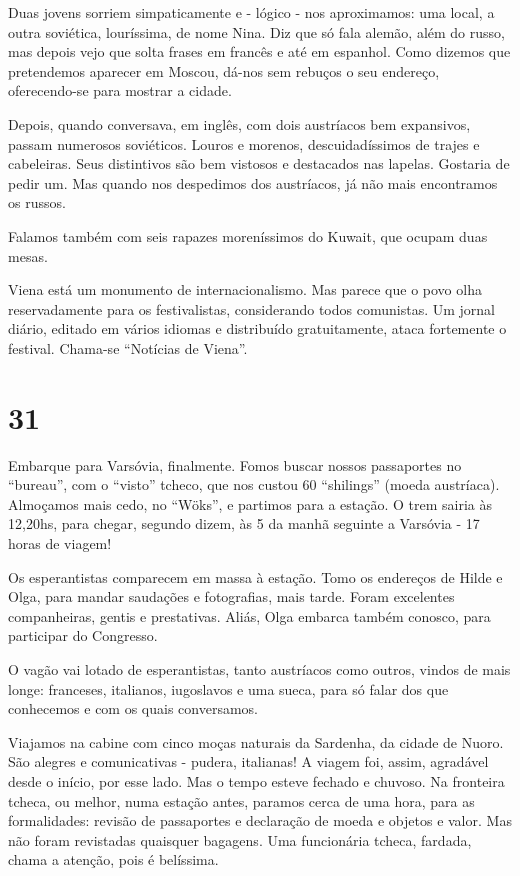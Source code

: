 Duas jovens sorriem simpaticamente e - lógico - nos aproximamos: uma local, a outra soviética, louríssima, de nome Nina. Diz que só fala alemão, além do russo, mas depois vejo que solta frases em francês e até em espanhol. Como dizemos que pretendemos aparecer em Moscou, dá-nos sem rebuços o seu endereço, oferecendo-se para mostrar a cidade.

Depois, quando conversava, em inglês, com dois austríacos bem expansivos, passam numerosos soviéticos. Louros e morenos, descuidadíssimos de trajes e cabeleiras. Seus distintivos são bem vistosos e destacados nas lapelas. Gostaria de pedir um. Mas quando nos despedimos dos austríacos, já não mais encontramos os russos.

Falamos também com seis rapazes moreníssimos do Kuwait, que ocupam duas mesas.

Viena está um monumento de internacionalismo. Mas parece que o povo olha reservadamente para os festivalistas, considerando todos comunistas. Um jornal diário, editado em vários idiomas e distribuído gratuitamente, ataca fortemente o festival. Chama-se “Notícias de Viena”.

\section*{31 \adfflatleafright {}}
Embarque para Varsóvia, finalmente. Fomos buscar nossos passaportes no “bureau”, com o “visto” tcheco, que nos custou 60 “shilings” (moeda austríaca). Almoçamos mais cedo, no “Wöks”, e partimos para a estação. O trem sairia às 12,20hs, para chegar, segundo dizem, às 5 da manhã seguinte a Varsóvia - 17 horas de viagem!

Os esperantistas comparecem em massa à estação. Tomo os endereços de Hilde e Olga, para mandar saudações e fotografias, mais tarde. Foram excelentes companheiras, gentis e prestativas. Aliás, Olga embarca também conosco, para participar do Congresso.

O vagão vai lotado de esperantistas, tanto austríacos como outros, vindos de mais longe: franceses, italianos, iugoslavos e uma sueca, para só falar dos que conhecemos e com os quais conversamos.

Viajamos na cabine com cinco moças naturais da Sardenha, da cidade de Nuoro. São alegres e comunicativas - pudera, italianas! A viagem foi, assim, agradável desde o início, por esse lado. Mas o tempo esteve fechado e chuvoso. Na fronteira tcheca, ou melhor, numa estação antes, paramos cerca de uma hora, para as formalidades: revisão de passaportes e declaração de moeda e objetos e valor. Mas não foram revistadas quaisquer bagagens. Uma funcionária tcheca, fardada, chama a atenção, pois é belíssima.

